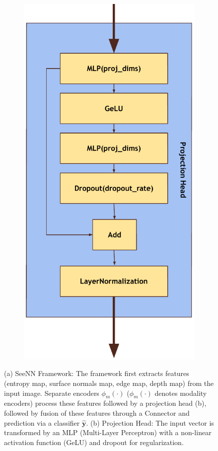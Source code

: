 \begin{figure}
\begin{subfigure}[b]{0.2\textwidth}
        \includegraphics[width=\textwidth]{imgs/Projection Head.pdf}
    \label{fig:projection_head}
        \caption{}
    \end{subfigure}
\caption{
(a) SeeNN Framework: The framework first extracts features (entropy map, surface normals map, edge map, depth map) from the input image. Separate encoders $\phi_{m}(\cdot)$ ($\phi_{m}(\cdot)$ denotes modality encoders) process these features followed by a projection head (b), followed by fusion of these features through a Connector and prediction via a classifier $\mathbf{\hat{y}}$.
(b) Projection Head: The input vector is transformed by an MLP (Multi-Layer Perceptron) with a non-linear activation function (GeLU) and dropout for regularization.
}
\label{fig:seeeNN}
\end{figure}

